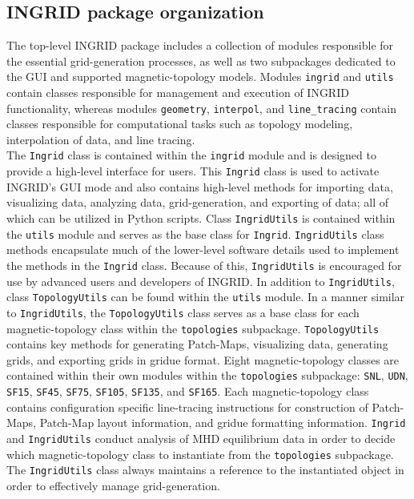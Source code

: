 \subsection{\label{sec:label2}INGRID package organization}
The top-level INGRID package includes a collection of modules responsible for the essential grid-generation processes, as well as two subpackages dedicated to the GUI and supported magnetic-topology models. Modules \texttt{ingrid} and \texttt{utils} contain classes responsible for management and execution of INGRID functionality, whereas modules \texttt{geometry}, \texttt{interpol}, and \texttt{line\_tracing} contain classes responsible for computational tasks such as topology modeling, interpolation of data, and line tracing. \\ \indent
The \texttt{Ingrid} class is contained within the \texttt{ingrid} module and is designed to provide a high-level interface for users. This \texttt{Ingrid} class is used to activate INGRID's GUI mode and also contains high-level methods for importing data, visualizing data, analyzing data, grid-generation, and exporting of data; all of which can be utilized in Python scripts. Class \texttt{IngridUtils} is contained within the \texttt{utils} module and serves as the base class for \texttt{Ingrid}. \texttt{IngridUtils} class methods encapsulate much of the lower-level software details used to implement the methods in the \texttt{Ingrid} class. Because of this, \texttt{IngridUtils} is encouraged for use by advanced users and developers of INGRID. In addition to \texttt{IngridUtils}, class \texttt{TopologyUtils} can be found within the \texttt{utils} module. In a manner similar to \texttt{IngridUtils}, the \texttt{TopologyUtils} class serves as a base class for each magnetic-topology class within the \texttt{topologies} subpackage. \texttt{TopologyUtils} contains key methods for generating Patch-Maps, visualizing data, generating grids, and exporting grids in gridue format. Eight magnetic-topology classes are contained within their own modules within the \texttt{topologies} subpackage: \texttt{SNL}, \texttt{UDN}, \texttt{SF15}, \texttt{SF45}, \texttt{SF75}, \texttt{SF105}, \texttt{SF135}, and \texttt{SF165}. Each magnetic-topology class contains configuration specific line-tracing instructions for construction of Patch-Maps, Patch-Map layout information, and gridue formatting information. \texttt{Ingrid} and \texttt{IngridUtils} conduct analysis of MHD equilibrium data in order to decide which magnetic-topology class to instantiate from the \texttt{topologies} subpackage. The \texttt{IngridUtils} class always maintains a reference to the instantiated object in order to effectively manage grid-generation.\\ \indent
